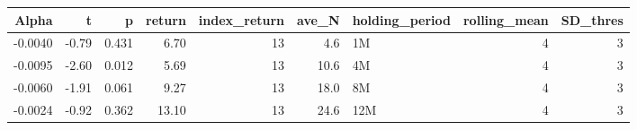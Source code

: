 \begin{table}[ht]
\centering
\begin{tabular}{rrrrrrlrr}
  \hline
Alpha & t & p & return & index\_return & ave\_N & holding\_period & rolling\_mean & SD\_thres \\ 
  \hline
-0.0040 & -0.79 & 0.431 & 6.70 & 13 & 4.6 & 1M &  4 &  3 \\ 
  -0.0095 & -2.60 & 0.012 & 5.69 & 13 & 10.6 & 4M &  4 &  3 \\ 
  -0.0060 & -1.91 & 0.061 & 9.27 & 13 & 18.0 & 8M &  4 &  3 \\ 
  -0.0024 & -0.92 & 0.362 & 13.10 & 13 & 24.6 & 12M &  4 &  3 \\ 
   \hline
\end{tabular}
\end{table}


